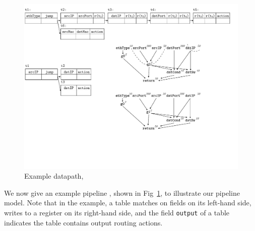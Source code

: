 
\begin{figure}[tbh]
    \centering
    \vspace{-1mm}
    \includegraphics[scale = 0.6]{figures/figure3.pdf}
    \vspace{-2mm}
    \caption{Example datapath, \exampledp}
    \label{fig:swPipeline}
    \vspace{-2mm}
\end{figure}

 We now give an example pipeline \exampledp, shown in Fig~\ref{fig:swPipeline}, to illustrate our pipeline model. Note that in the example, a table matches on fields on its left-hand side, writes to a register on its right-hand side, and the field \texttt{output} of a table indicates the table contains output routing actions.





